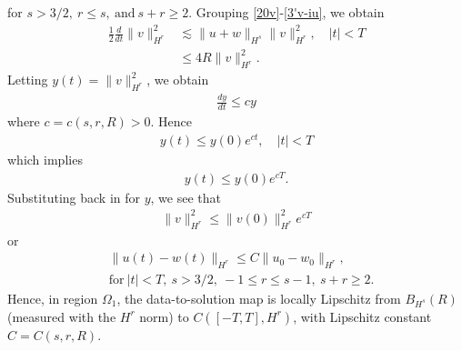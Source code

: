 %
%
for $s > 3/2, \ r \le s, \ \text{and} \ s + r \ge 2$.
%
%
%
%
Grouping \eqref{20v}-\eqref{3'v-iu}, we obtain
%
%
\begin{equation*}
\begin{split}
\frac{1}{2} \frac{d}{dt}
\|v\|_{H^r}^2
& \lesssim \|u+w\|_{H^s}
\|v\|_{H^r}^2, \quad | t | < T
\\
& \le 4R \| v \|_{H^{r}}^{2}.
\label{9v-iu}
\end{split}
\end{equation*}
%
%
%
%
%
Letting $y(t) = \| v \|^{2}_{H^{r}}$, we obtain
%
%
%
\begin{equation*}
\begin{split}
\frac{dy}{dt} \le cy
\end{split}
\end{equation*}
%
where $c = c(s, r, R) > 0$. Hence
%
%
\begin{equation*}
\begin{split}
y(t) \le y(0) e^{ct}, \quad | t | < T
\end{split}
\end{equation*}
%
%
which implies
%
%
\begin{equation*}
\begin{split}
y(t) \le y(0) e^{cT}.
\end{split}
\end{equation*}
%
%
Substituting back in for $y$, we see that
%
%
\begin{equation*}
\begin{split}
\| v \|_{H^{r}}^{2} \le \| v(0) \|^{2}_{H^{r}} e^{cT}
\end{split}
\end{equation*}
%
%
or
%
%
\begin{equation}
\label{lip-ineq}
\begin{split}
& \| u(t) - w(t) \|_{H^{r}} \le C \| u_{0} - w_{0} \|_{H^{r}}, 
\\
& \text{for} \ | t | < T,
\ s > 3/2, \ -1 \le r \le s-1, \ s + r \ge 2.
\end{split}
\end{equation}
%
Hence, in region $\Omega_{1}$, the data-to-solution map is locally Lipschitz from
$B_{H^{s}}(R)$ (measured with the $H^{r}$
norm) to $C([-T, T], H^{r})$, with Lipschitz constant $C = C(s, r, R)$.
%
%
%
%
%
%
%
%
%
%
